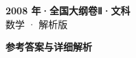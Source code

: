 \documentclass[zihao=-4, a4paper]{ctexart}
\begin{document}
\begin{center}
  {\Large\bfseries 2008 年·全国大纲卷Ⅱ·文科}\\[4pt]
  {\large 数学 · 解析版}
\end{center}
\medskip
{}

\clearpage
{}
\begin{center}{\Large\bfseries 参考答案与详细解析}\end{center}
\medskip

\end{document}
